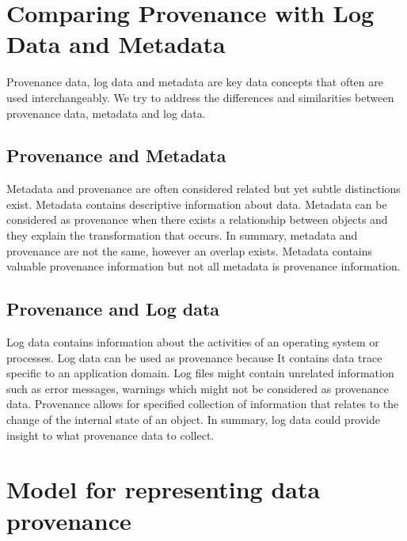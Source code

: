 \section{Comparing Provenance with Log Data and Metadata}

Provenance data, log data and metadata are key data concepts that often are used interchangeably. We try to address the differences and similarities between provenance data, metadata and log data.

\subsection{Provenance and Metadata}
Metadata and provenance are often considered related but yet subtle distinctions exist. Metadata contains descriptive information about data. Metadata can be considered as provenance when there exists a relationship between objects and they explain the transformation that occurs. In summary,  metadata and provenance are not the same, however an overlap exists. Metadata contains valuable  provenance information but not all metadata is provenance information. 


\subsection{Provenance and Log data}
Log data contains information about the activities of an operating system or processes. Log data can be used as provenance because It contains data trace specific to an application domain. Log files might contain unrelated information such as error messages, warnings which might not be considered as provenance data. Provenance allows for specified collection of information that relates to the change of the internal state of an object. In summary, log data could provide insight to what provenance data to collect. 


 

%

\section{Model for representing data provenance}



